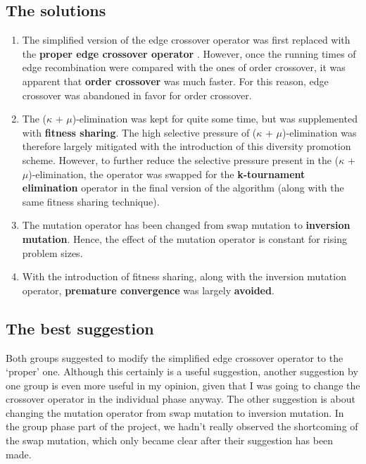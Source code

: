 \documentclass[a4paper,10pt]{article}
\begin{document}
\subsection{The solutions}
\begin{enumerate}
 \item The simplified version of the edge crossover operator was first replaced with the \textbf{proper edge crossover operator} \cite{eiben_smith}. However, once the running times of edge recombination were compared with the ones of order crossover, it was apparent that \textbf{order crossover} was much faster. For this reason, edge crossover was abandoned in favor for order crossover.
 \item The ($\kappa$ + $\mu$)-elimination was kept for quite some time, but was supplemented with \textbf{fitness sharing}. The high selective pressure of ($\kappa$ + $\mu$)-elimination was therefore largely mitigated with the introduction of this diversity promotion scheme. However, to further reduce the selective pressure present in the ($\kappa$ + $\mu$)-elimination, the operator was swapped for the \textbf{k-tournament elimination} operator in the final version of the algorithm (along with the same fitness sharing technique).
 \item The mutation operator has been changed from swap mutation to \textbf{inversion mutation}. Hence, the effect of the mutation operator is constant for rising problem sizes.
 \item With the introduction of fitness sharing, along with the inversion mutation operator, \textbf{premature convergence} was largely \textbf{avoided}.
\end{enumerate}

\subsection{The best suggestion}
Both groups suggested to modify the simplified edge crossover operator to the `proper' one. Although this certainly is a useful suggestion, another suggestion by one group is even more useful in my opinion, given that I was going to change the crossover operator in the individual phase anyway. The other suggestion is about changing the mutation operator from swap mutation to inversion mutation. In the group phase part of the project, we hadn't really observed the shortcoming of the swap mutation, which only became clear after their suggestion has been made.
\end{document}
